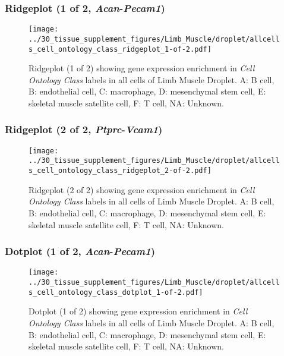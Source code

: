 \clearpage

\subsubsection{Ridgeplot (1 of 2, \emph{Acan}-\emph{Pecam1})}
\begin{figure}[h]
\centering
\texttt{[image: ../30\_tissue\_supplement\_figures/Limb\_Muscle/droplet/allcells\_cell\_ontology\_class\_ridgeplot\_1-of-2.pdf]}

\caption{ Ridgeplot (1 of 2)  showing gene expression enrichment in \emph{Cell Ontology Class} labels in all cells of Limb Muscle Droplet. A: B cell, B: endothelial cell, C: macrophage, D: mesenchymal stem cell, E: skeletal muscle satellite cell, F: T cell, NA: Unknown.}
\end{figure}


\clearpage

\subsubsection{Ridgeplot (2 of 2, \emph{Ptprc}-\emph{Vcam1})}
\begin{figure}[h]
\centering
\texttt{[image: ../30\_tissue\_supplement\_figures/Limb\_Muscle/droplet/allcells\_cell\_ontology\_class\_ridgeplot\_2-of-2.pdf]}

\caption{ Ridgeplot (2 of 2)  showing gene expression enrichment in \emph{Cell Ontology Class} labels in all cells of Limb Muscle Droplet. A: B cell, B: endothelial cell, C: macrophage, D: mesenchymal stem cell, E: skeletal muscle satellite cell, F: T cell, NA: Unknown.}
\end{figure}


\clearpage

\subsubsection{Dotplot (1 of 2, \emph{Acan}-\emph{Pecam1})}
\begin{figure}[h]
\centering
\texttt{[image: ../30\_tissue\_supplement\_figures/Limb\_Muscle/droplet/allcells\_cell\_ontology\_class\_dotplot\_1-of-2.pdf]}

\caption{ Dotplot (1 of 2)  showing gene expression enrichment in \emph{Cell Ontology Class} labels in all cells of Limb Muscle Droplet. A: B cell, B: endothelial cell, C: macrophage, D: mesenchymal stem cell, E: skeletal muscle satellite cell, F: T cell, NA: Unknown.}
\end{figure}


